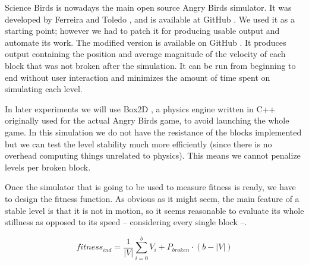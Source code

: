 \documentclass[sigconf]{acmart}
\begin{document}


Science Birds is nowadays the main open source Angry Birds simulator. It was developed by  Ferreira and Toledo \cite{ferreira2014search}, and is available at
GitHub \cite{sciencebirds}. We used it  as a starting point; however we
had to patch it for producing usable output 
and automate its work. The modified 
version is available on GitHub \cite{sciencebirds-adapt}. It produces output 
containing the position and average magnitude of the velocity of each block 
that was not broken after the simulation. It can be run from beginning to end 
without user interaction and minimizes the amount of time spent on simulating 
each level. 

In later experiments we will use Box2D \cite{box2d}, a physics engine written in C++ originally
used for the actual Angry Birds game, to avoid launching the whole game. In this 
simulation we do not have the resistance of the blocks implemented but we can test
the level stability much more efficiently (since there is no overhead computing things
unrelated to physics). This means we cannot penalize levels per broken block.


Once the simulator that is going to be used to measure fitness is
ready, we have to design the fitness function. As obvious as it
might seem, the main feature of a stable level is that it 
is not in motion, so it seems reasonable to evaluate its whole stillness as opposed to its speed -- considering every single block --.

$$fitness_{ind} = \frac{1}{|V|}\sum_{i=0}^{b}{V_i} + P_{broken}\cdot(b-|V|)$$
\end{document}
